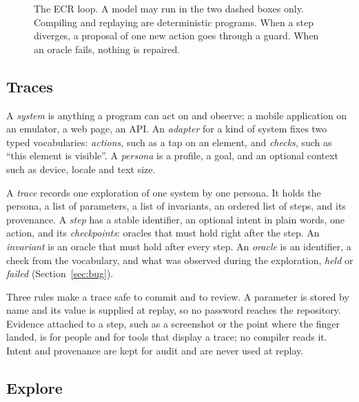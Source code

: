 \begin{figure}[t]
\caption{The ECR loop. A model may run in the two dashed boxes only. Compiling and replaying are deterministic programs. When a step diverges, a proposal of one new action goes through a guard. When an oracle fails, nothing is repaired.}
\label{fig:loop}
\end{figure}

\subsection{Traces}

A \emph{system} is anything a program can act on and observe: a mobile application on an emulator, a web page, an API. An \emph{adapter} for a kind of system fixes two typed vocabularies: \emph{actions}, such as a tap on an element, and \emph{checks}, such as ``this element is visible''. A \emph{persona} is a profile, a goal, and an optional context such as device, locale and text size.

A \emph{trace} records one exploration of one system by one persona. It holds the persona, a list of parameters, a list of invariants, an ordered list of steps, and its provenance. A \emph{step} has a stable identifier, an optional intent in plain words, one action, and its \emph{checkpoints}: oracles that must hold right after the step. An \emph{invariant} is an oracle that must hold after every step. An \emph{oracle} is an identifier, a check from the vocabulary, and what was observed during the exploration, \emph{held} or \emph{failed} (Section~\ref{sec:bug}).

Three rules make a trace safe to commit and to review. A parameter is stored by name and its value is supplied at replay, so no password reaches the repository. Evidence attached to a step, such as a screenshot or the point where the finger landed, is for people and for tools that display a trace; no compiler reads it. Intent and provenance are kept for audit and are never used at replay.

\subsection{Explore}

